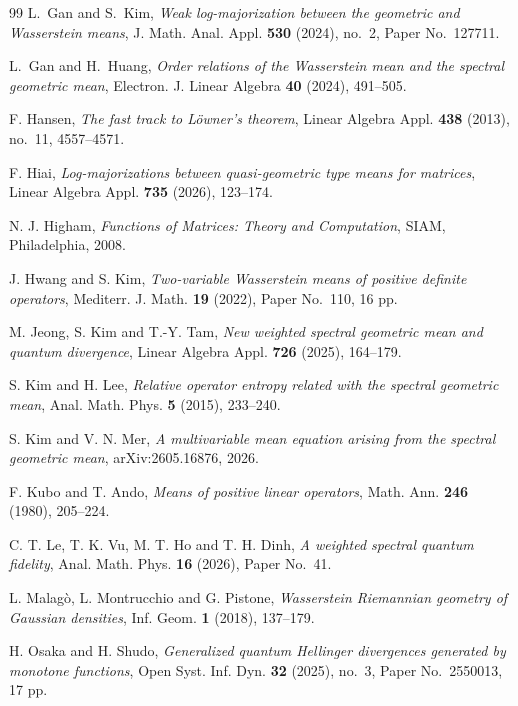 \documentclass[11pt]{amsart}
\theoremstyle{definition}
\theoremstyle{remark}
\begin{document}
\begin{thebibliography}{99}
		L.~Gan and S.~Kim,
		\emph{Weak log-majorization between the geometric and Wasserstein means},
		J. Math. Anal. Appl. \textbf{530} (2024), no.~2,
		Paper No.~127711.
		
		L.~Gan and H.~Huang,
		\emph{Order relations of the Wasserstein mean and the spectral geometric mean},
		Electron. J. Linear Algebra \textbf{40} (2024), 491--505.
		

	 
		
		F. Hansen,
		\emph{The fast track to L\"owner's theorem},
		Linear Algebra Appl. \textbf{438} (2013), no.~11, 4557--4571.
	 
		
		F. Hiai,
		\emph{Log-majorizations between quasi-geometric type means for matrices},
		Linear Algebra Appl. \textbf{735} (2026), 123--174.
	 
		N. J. Higham,
		\emph{Functions of Matrices: Theory and Computation},
		SIAM, Philadelphia, 2008.
		
		J. Hwang and S. Kim,
		\emph{Two-variable Wasserstein means of positive definite operators},
		Mediterr. J. Math. \textbf{19} (2022), Paper No.~110, 16 pp.
	 
		
		M. Jeong, S. Kim and T.-Y. Tam,
		\emph{New weighted spectral geometric mean and quantum divergence},
		Linear Algebra Appl. \textbf{726} (2025), 164--179.
		
		S. Kim and H. Lee,
		\emph{Relative operator entropy related with the spectral geometric mean},
		Anal. Math. Phys. \textbf{5} (2015), 233--240.
 
		
		S. Kim and V. N. Mer,
		\emph{A multivariable mean equation arising from the spectral geometric mean},
		arXiv:2605.16876, 2026.
 
		
		F. Kubo and T. Ando,
		\emph{Means of positive linear operators},
		Math. Ann. \textbf{246} (1980), 205--224.
		
		C. T. Le, T. K. Vu, M. T. Ho and T. H. Dinh,
		\emph{A weighted spectral quantum fidelity},
		Anal. Math. Phys. \textbf{16} (2026), Paper No.~41.
 
		
		L. Malag\`o, L. Montrucchio and G. Pistone,
		\emph{Wasserstein Riemannian geometry of Gaussian densities},
		Inf. Geom. \textbf{1} (2018), 137--179.
		
		H. Osaka and H. Shudo,
		\emph{Generalized quantum Hellinger divergences generated by monotone
			functions},
		Open Syst. Inf. Dyn. \textbf{32} (2025), no.~3,
		Paper No.~2550013, 17 pp.
 

\end{thebibliography}
\end{document}
